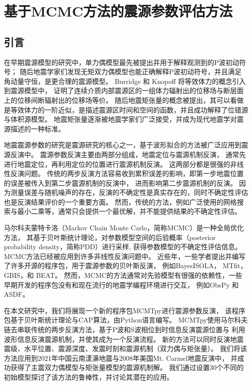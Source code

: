 
\chapter{基于MCMC方法的震源参数评估方法}

\section{引言}

在早期震源模型的研究中，单力偶模型最先被提出并用于解释观测到的P波初动符号\citep{nakano1923notes}；
随后地震学家们发现无矩双力偶模型也能正确解释P波初动符号，并且满足角动量守恒，是更合理的震源模型\citep{honda1957mechanism}。
Burridge 和 Knopoff \citep{Burridge1964}将等效体力的概念引入到震源模型中，
证明了连续介质内部震源区的一组体力辐射出的位移场与断层面上的位移间断辐射出的位移场等价。
随后地震矩张量的概念被提出，其可以看做是等效体力的一阶近似，是描述震源区时间和空间的函数，并且成功解释了位错源与体积源模型。
地震矩张量逐渐被地震学家们广泛接受，并成为现代地震学对震源描述的一种标准。

地震震源参数的研究是震源研究的核心之一，基于波形拟合的方法被广泛应用到震源反演中。
震源参数反演主要由两部分组成，地震定位与震源机制反演，
通常先进行地震定位，再利用定位的位置进行震源机制反演。
这两部分都是很强的非线性反演问题。
传统的两步反演方法容易收到累积误差的影响，即第一步地震位置的误差被传入到第二步震源机制的反演中，
进而影响第二步震源机制的反演\citep{Tan2018}。
因为测量误差与随机噪声的存在，反演的不确定性是真实存在的，同时不确定性评估也是反演结果评价的一个重要方面。
然而，传统的方法，例如广泛使用的网格搜索与最小二乘等，通常只会提供一个最优解，并不能提供结果的不确定性评估。

马尔科夫蒙特卡洛（Markov Chain Monte Carlo，简称MCMC）是一种全局优化方法，
其基于贝叶斯统计理论，对参数模型空间的后验概率（posterior probability density，简称PDD）进行采样,
获得参数模型的不确定性评估信息。
MCMC方法已经被应用到许多非线性反演问题中。
近些年，一些学者提出并编写了许多开源的程序包，用于震源参数的贝叶斯反演，
例如BayesISOLA\citep{Vackaar2017}， MTfit\citep{Pugh2018}，GBIS\citep{Bagnardi2018}，和 BEAT\citep{Vasyura-Bathke2020}。
然而，MCMC的方法通常对先验模型有很强的依赖性，一些早期开发的程序包没有和现在流行的地震学编程环境进行交互，
例如ObsPy\citep{Beyreuther2010} 和 ASDF\citep{Krischer2016}。

在本文研究中，我们将展现一个新的程序包MCMTpy进行震源参数反演，
该程序包基于贝叶斯统计理论与CAP算法，由Python语言编写。
MCMTpy使用马尔科夫链去串联传统的两步反演方法，基于P波和S波相位到时信息反演震源位置与
利用波形信息反演震源机制，并使其成为一个反演流程。
新的方法可以同时反演地震震级、水平位置、震源深度、发震时刻和震源机制（双力偶与矩张量）。
我们将该方法应用到2021年中国云南漾濞地震与2008年美国Mt. Carmel地震反演中，
并成功获得了主震双力偶模型与矩张量模型的震源机制解。
我们通过设置30个不同的初始模型探讨了该方法的鲁棒性，并讨论其潜在的应用。

